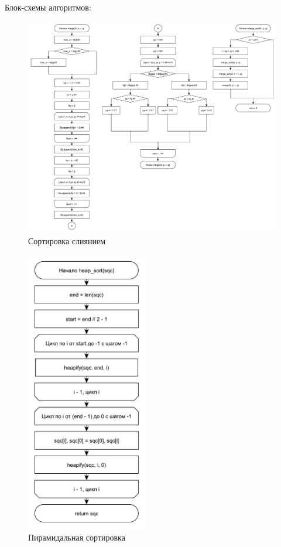 \documentclass[12pt,a4paper]{scrartcl}
\begin{document}
Блок-схемы алгоритмов: 



\begin{figure}[h!]
	\centering
	\includegraphics[width=\linewidth]{merge.pdf}
	\caption{Сортировка слиянием}
	\label{graph2.1}
\end{figure}

\begin{figure}[h!]
	\centering
	\includegraphics[width=200px]{2.pdf}
	\caption{Пирамидальная сортировка}
	\label{graph2.2}
\end{figure}
\end{document}
